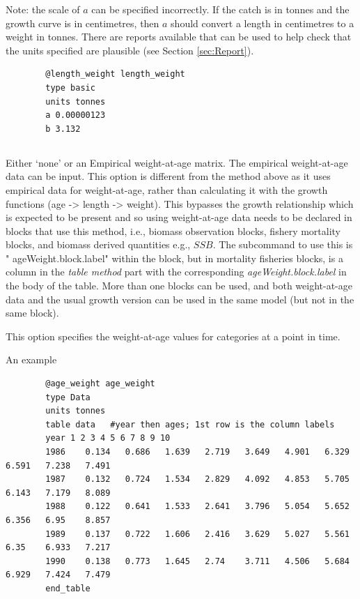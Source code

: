 Note: the scale of $a$ can be specified incorrectly. If the catch is in tonnes and the growth curve is in centimetres, then $a$ should convert a length in centimetres to a weight in tonnes. There are reports available that can be used to help check that the units specified are plausible (see Section \ref{sec:Report}).
{\small{\begin{verbatim}
		@length_weight length_weight
		type basic
		units tonnes
		a 0.00000123
		b 3.132
\end{verbatim}}}

\ifAgeBased
\subsection{}\label{sec:AgeWeight} 

Either `none' \label{sec:AgeWeight-None} or an Empirical weight-at-age matrix. The empirical weight-at-age data can be input\label{sec:AgeWeight-Data}. This option is different from the method above as it uses empirical data for weight-at-age, rather than calculating it with the growth functions (age -> length -> weight). This bypasses the growth relationship which is expected to be present and so using weight-at-age data needs to be declared in blocks that use this method, i.e., biomass observation blocks, fishery mortality blocks, and biomass derived quantities e.g., $SSB$. The subcommand to use this is " ageWeight.block.label" within the block, but in mortality fisheries blocks,  is a column in the \textit{table method} part with the corresponding \textit{ageWeight.block.label} in the body of the table. More than one  blocks can be used, and both weight-at-age data and the usual growth version can be used in the same model (but not in the same block).

This option specifies the weight-at-age values for categories at a point in time.

An example

{\small{\begin{verbatim}
		@age_weight age_weight
		type Data
		units tonnes
		table data   #year then ages; 1st row is the column labels
		year 1 2 3 4 5 6 7 8 9 10
		1986	0.134	0.686	1.639	2.719	3.649	4.901	6.329	6.591	7.238	7.491
		1987	0.132	0.724	1.534	2.829	4.092	4.853	5.705	6.143	7.179	8.089
		1988	0.122	0.641	1.533	2.641	3.796	5.054	5.652	6.356	6.95	8.857
		1989	0.137	0.722	1.606	2.416	3.629	5.027	5.561	6.35	6.933	7.217
		1990	0.138	0.773	1.645	2.74	3.711	4.506	5.684	6.929	7.424	7.479
		end_table
\end{verbatim}}}

